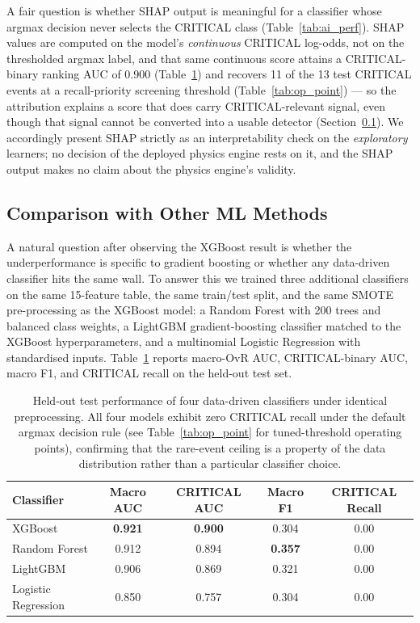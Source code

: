 \documentclass[sn-mathphys-num,Numbered,iicol]{sn-jnl}
\begin{document}
A fair question is whether SHAP output is meaningful for a classifier whose argmax decision never selects the CRITICAL class (Table~\ref{tab:ai_perf}). SHAP values are computed on the model's \emph{continuous} CRITICAL log-odds, not on the thresholded argmax label, and that same continuous score attains a CRITICAL-binary ranking AUC of 0.900 (Table~\ref{tab:ml_compare}) and recovers 11 of the 13 test CRITICAL events at a recall-priority screening threshold (Table~\ref{tab:op_point}) --- so the attribution explains a score that does carry CRITICAL-relevant signal, even though that signal cannot be converted into a usable detector (Section~\ref{sec:other_ml}). We accordingly present SHAP strictly as an interpretability check on the \emph{exploratory} learners; no decision of the deployed physics engine rests on it, and the SHAP output makes no claim about the physics engine's validity.

\subsection{Comparison with Other ML Methods}\label{sec:other_ml}
A natural question after observing the XGBoost result is whether the underperformance is specific to gradient boosting or whether any data-driven classifier hits the same wall. To answer this we trained three additional classifiers on the same 15-feature table, the same train/test split, and the same SMOTE pre-processing as the XGBoost model: a Random Forest with 200 trees and balanced class weights, a LightGBM gradient-boosting classifier matched to the XGBoost hyperparameters, and a multinomial Logistic Regression with standardised inputs. Table~\ref{tab:ml_compare} reports macro-OvR AUC, CRITICAL-binary AUC, macro F1, and CRITICAL recall on the held-out test set.

\begin{table}[htbp]
  \centering
  \caption{Held-out test performance of four data-driven classifiers under identical preprocessing. All four models exhibit zero CRITICAL recall under the default argmax decision rule (see Table~\ref{tab:op_point} for tuned-threshold operating points), confirming that the rare-event ceiling is a property of the data distribution rather than a particular classifier choice.}
  \label{tab:ml_compare}
  \renewcommand{\arraystretch}{1.2}
  \begin{tabular}{@{}lcccc@{}}
    \toprule
    \textbf{Classifier} & \textbf{Macro AUC} & \textbf{CRITICAL AUC} & \textbf{Macro F1} & \textbf{CRITICAL Recall} \\
    \midrule
    XGBoost              & \textbf{0.921} & \textbf{0.900} & 0.304          & 0.00 \\
    Random Forest        & 0.912          & 0.894          & \textbf{0.357} & 0.00 \\
    LightGBM             & 0.906          & 0.869          & 0.321          & 0.00 \\
    Logistic Regression  & 0.850          & 0.757          & 0.304          & 0.00 \\
    \bottomrule
  \end{tabular}
\end{table}
\end{document}
